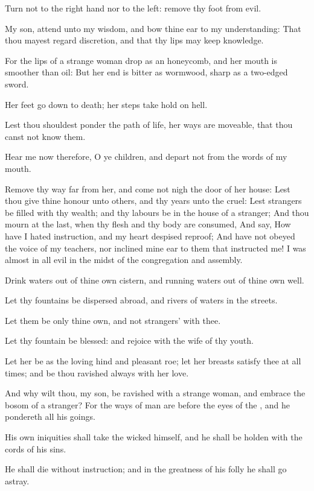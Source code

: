 \Verse Turn not to the right hand nor to the left: remove thy foot from evil.


\Chapter
\Verse My son, attend unto my wisdom, and bow thine ear to my understanding: \Verse That thou mayest regard discretion, and that thy lips may keep knowledge.

\Verse For the lips of a strange woman drop as an honeycomb, and her mouth is smoother than oil: \Verse But her end is bitter as wormwood, sharp as a two-edged sword.

\Verse Her feet go down to death; her steps take hold on hell.

\Verse Lest thou shouldest ponder the path of life, her ways are moveable, that thou canst not know them.

\Verse Hear me now therefore, O ye children, and depart not from the words of my mouth.

\Verse Remove thy way far from her, and come not nigh the door of her house: \Verse Lest thou give thine honour unto others, and thy years unto the cruel: \Verse Lest strangers be filled with thy wealth; and thy labours be in the house of a stranger; \Verse And thou mourn at the last, when thy flesh and thy body are consumed, \Verse And say, How have I hated instruction, and my heart despised reproof; \Verse And have not obeyed the voice of my teachers, nor inclined mine ear to them that instructed me!  \Verse I was almost in all evil in the midst of the congregation and assembly.

\Verse Drink waters out of thine own cistern, and running waters out of thine own well.

\Verse Let thy fountains be dispersed abroad, and rivers of waters in the streets.

\Verse Let them be only thine own, and not strangers' with thee.

\Verse Let thy fountain be blessed: and rejoice with the wife of thy youth.

\Verse Let her be as the loving hind and pleasant roe; let her breasts satisfy thee at all times; and be thou ravished always with her love.

\Verse And why wilt thou, my son, be ravished with a strange woman, and embrace the bosom of a stranger?  \Verse For the ways of man are before the eyes of the \LORD, and he pondereth all his goings.

\Verse His own iniquities shall take the wicked himself, and he shall be holden with the cords of his sins.

\Verse He shall die without instruction; and in the greatness of his folly he shall go astray.


